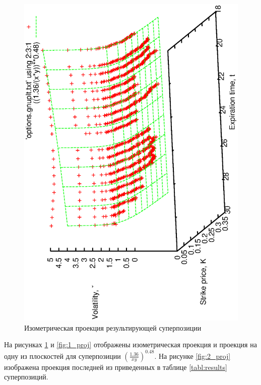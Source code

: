 \documentclass[12pt,a4paper]{amsart}
\begin{document}
\begin{figure}[h]
  \includegraphics[scale=0.80,angle=-90]{figs/1-iso.eps}
  \caption{Изометрическая проекция результирующей суперпозиции}
  \label{fig:1_iso}
\end{figure}

На рисунках \ref{fig:1_iso} и \ref{fig:1_proj} отображены изометрическая
проекция и проекция на одну из плоскостей для суперпозиции
$\left(\frac{1.36}{xy}\right)^{0.48}$. На рисунке \ref{fig:2_proj}
изображена проекция последней из приведенных в таблице \ref{tabl:results} суперпозиций.
\end{document}
